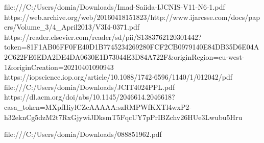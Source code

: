 file:///C:/Users/domia/Downloads/Imad-Saiida-IJCNIS-V11-N6-1.pdf
https://web.archive.org/web/20160418151823/http://www.ijarcsse.com/docs/papers/Volume_3/4_April2013/V3I4-0371.pdf
https://reader.elsevier.com/reader/sd/pii/S1383762120301442?token=81F1AB06FF0FE40D1B7745234269280FCF2CB0979140E84DB35D6E04A2C622FE6EDA2DE4DA0630E1D73044E3D84A722F&originRegion=eu-west-1&originCreation=20210401090943
https://iopscience.iop.org/article/10.1088/1742-6596/1140/1/012042/pdf
file:///C:/Users/domia/Downloads/JCIT4024PPL.pdf
https://dl.acm.org/doi/abs/10.1145/2046614.2046618?casa_token=MXpfHiylCZcAAAAA:szRMPWfKXTl4wxP2-h32eknCg5dzM2t7RxGjywiJDksmT5FqcUY7pPrIBZchv26HUe3Lwubu5Hru

file:///C:/Users/domia/Downloads/088851962.pdf




